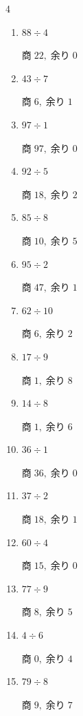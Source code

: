 \begin{multicols}{4}
\begin{enumerate}
\columnbreak %

  \item $88 \div 4$

        $商\; 22,\; 余り\; 0$

  \item $43 \div 7$

        $商\; 6,\; 余り\; 1$

  \item $97 \div 1$

        $商\; 97,\; 余り\; 0$

  \item $92 \div 5$

        $商\; 18,\; 余り\; 2$

  \item $85 \div 8$

        $商\; 10,\; 余り\; 5$

  \item $95 \div 2$

        $商\; 47,\; 余り\; 1$

  \item $62 \div 10$

        $商\; 6,\; 余り\; 2$

  \item $17 \div 9$

        $商\; 1,\; 余り\; 8$

  \item $14 \div 8$

        $商\; 1,\; 余り\; 6$

  \item $36 \div 1$

        $商\; 36,\; 余り\; 0$

  \item $37 \div 2$

        $商\; 18,\; 余り\; 1$

  \item $60 \div 4$

        $商\; 15,\; 余り\; 0$

  \item $77 \div 9$

        $商\; 8,\; 余り\; 5$

  \item $4 \div 6$

        $商\; 0,\; 余り\; 4$

  \item $79 \div 8$

        $商\; 9,\; 余り\; 7$


\end{enumerate}
\end{multicols}
